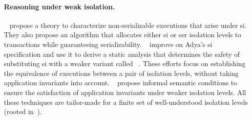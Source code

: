 \paragraph{Reasoning under weak isolation.} ~\cite{feketessi} propose
a theory to characterize non-serializable executions that arise under
{\sc si}. They also propose an algorithm that
allocates either {\sc si} or {\sc ser} isolation levels to
transactions while guaranteeing
serializability. ~\cite{gotsmanpodc16} improve
on Adya's {\sc si} specification and use it to derive a static
analysis that determines the safety of substituting {\sc si} with a
weaker variant called ~\cite{psi}.
These efforts focus on establishing the equivalence of executions
between a pair of isolation levels, without taking application
invariants into account. ~\cite{bern2000}
propose informal semantic conditions to ensure the satisfaction of
application invariants under weaker isolation levels.  All these
techniques are tailor-made for a finite set of well-understood
isolation levels (rooted in~\cite{berenson}).
\vspace*{-6pt}
